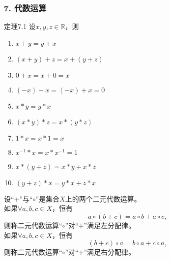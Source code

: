 \documentclass{beamer}
\begin{document}
\begin{CJK*}{UTF8}{gbsn}
\begin{frame}
  \frametitle{7. 代数运算}
  \begin{minipage}[t]{0.49\linewidth}
  \begin{block}{定理7.1}
    设$x, y, z \in \mathbb{R}$，则
   \begin{enumerate}
   \item   $x + y = y + x$
   \item   $(x + y) + z = x + (y + z)$
   \item   $0 + x = x + 0 = x$
   \item   $(-x) + x = (-x) + x = 0$
   \item   $x * y = y * x$
   \item   $(x * y) * z = x * (y *z)$
   \item   $1 * x = x * 1 = x$
   \item   $x^{-1} * x = x * x^{-1} = 1$
   \item   $x* (y + z) = x * y + x * z$
   \item   $(y + z) * x = y * x + z * x$
    \end{enumerate}
  \end{block}\pause
\end{minipage}
\begin{minipage}[t]{0.49\linewidth}
  \begin{Def}
    设“+”与“$\circ$”是集合$X$上的两个二元代数运算。\\如果$\forall a, b, c \in X$，恒有\[a \circ (b + c) = a \circ b + a \circ c,\] 则称二元代数运算“$\circ$”对“$+$”满足\alert{左分配律}。
    \\如果$\forall a, b, c \in X$，恒有\[(b + c)\circ a = b \circ a + c \circ a,\] 则称二元代数运算“$\circ$”对“$+$”满足\alert{右分配律}。
  \end{Def}
\end{minipage}
\end{frame}


\end{CJK*}
\end{document}
